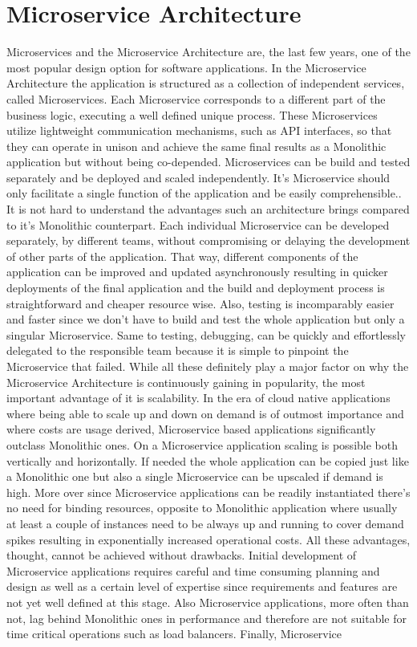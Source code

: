 \section{Microservice Architecture}

Microservices and the Microservice Architecture are, the last few years, one of the most popular design option for software applications. In the Microservice Architecture the application is structured as a collection of independent services, called Microservices. Each Microservice corresponds to a different part of the business logic, executing a well defined unique process\cite{monovsmicro}\cite{microservicesdef}. These Microservices utilize lightweight communication mechanisms, such as API interfaces, so that they can operate in unison and achieve the same final results as a Monolithic application but without being co-depended. Microservices can be build and tested separately and be deployed and scaled independently. It's Microservice should only facilitate a single function of the application and be easily comprehensible.\cite{chandrinos_thesis}. It is not hard to understand the advantages such an architecture brings compared to it's Monolithic counterpart. Each individual Microservice can be developed separately, by different teams, without compromising or delaying the development of other parts of the application. That way, different components of the application can be improved and updated asynchronously resulting in quicker deployments of the final application and the build and deployment process is straightforward and cheaper resource wise. Also, testing is incomparably easier and faster since we don't have to build and test the whole application but only a singular Microservice. Same to testing, debugging, can be quickly and effortlessly delegated to the responsible team because it is simple to pinpoint the Microservice that failed. While all these definitely play a major factor on why the Microservice Architecture is continuously gaining in popularity, the most important advantage of it is scalability. In the era of cloud native applications where being able to scale up and down on demand is of outmost importance and where costs are usage derived, Microservice based applications significantly outclass Monolithic ones. On a Microservice application scaling is possible both vertically and horizontally. If needed the whole application can be copied just like a Monolithic one but also a single Microservice can be upscaled if demand is high. More over since Microservice applications can be readily instantiated there's no need for binding resources, opposite to Monolithic application where usually at least a couple of instances need to be always up and running to cover demand spikes resulting in exponentially increased operational costs. All these advantages, thought, cannot be achieved without drawbacks. Initial development of Microservice applications requires careful and time consuming planning and design as well as a certain level of expertise since requirements and features are not yet well defined at this stage. Also Microservice applications, more often than not, lag behind Monolithic ones in performance and therefore are not suitable for time critical operations such as load balancers. Finally, Microservice 